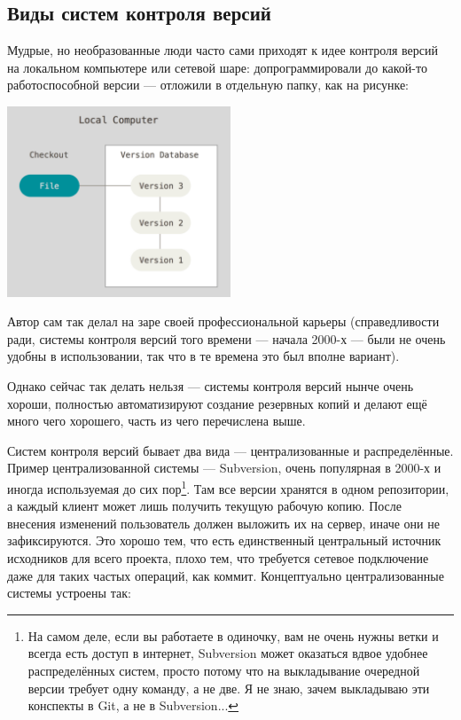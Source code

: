 \documentclass{../text-style}
\begin{document}
\subsection{Виды систем контроля версий}

Мудрые, но необразованные люди часто сами приходят к идее контроля версий на локальном компьютере или сетевой шаре: допрограммировали до какой-то работоспособной версии --- отложили в отдельную папку, как на рисунке:

\begin{center}
    \includegraphics[width=0.5\textwidth]{localCopies.png}
\end{center}

Автор сам так делал на заре своей профессиональной карьеры (справедливости ради, системы контроля версий того времени --- начала 2000-х --- были не очень удобны в использовании, так что в те времена это был вполне вариант).

Однако сейчас так делать нельзя --- системы контроля версий нынче очень хороши, полностью автоматизируют создание резервных копий и делают ещё много чего хорошего, часть из чего перечислена выше. 

Систем контроля версий бывает два вида --- централизованные и распределённые. Пример централизованной системы --- Subversion, очень популярная в 2000-х и иногда используемая до сих пор\footnote{На самом деле, если вы работаете в одиночку, вам не очень нужны ветки и всегда есть доступ в интернет, Subversion может оказаться вдвое удобнее распределённых систем, просто потому что на выкладывание очередной версии требует одну команду, а не две. Я не знаю, зачем выкладываю эти конспекты в Git, а не в Subversion...}. Там все версии хранятся в одном репозитории, а каждый клиент может лишь получить текущую рабочую копию. После внесения изменений пользователь должен выложить их на сервер, иначе они не зафиксируются. Это хорошо тем, что есть единственный центральный источник исходников для всего проекта, плохо тем, что требуется сетевое подключение даже для таких частых операций, как коммит. Концептуально централизованные системы устроены так:
\end{document}
